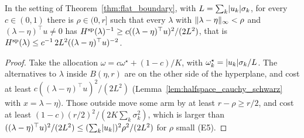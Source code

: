 \begin{lemma}
  \label{lem:static_near_hyperplane}
  \leanok
  In the setting of Theorem~\ref{thm:flat_boundary}, with $L = \sum_k \lvert u_k \rvert \sigma_k$, for
  every $c \in (0, 1)$ there is $\rho \in (0, r]$ such that every $\lambda$ with $\lVert \lambda -
  \eta \rVert_{\infty} < \rho$ and $(\lambda - \eta)^{\top} u \ne 0$ has
  $H^{\mathrm{sp}}(\lambda)^{-1} \ge c ((\lambda - \eta)^{\top} u)^2 / (2 L^2)$, that is
  $H^{\mathrm{sp}}(\lambda) \le c^{-1}\, 2 L^2 ((\lambda - \eta)^{\top} u)^{-2}$.
\end{lemma}

\begin{proof}
  \leanok
  Take the allocation $\omega = c \omega^{\star} + (1 - c) / K$, with $\omega^{\star}_k = \lvert u_k \rvert
  \sigma_k / L$. The alternatives to $\lambda$ inside $B(\eta, r)$ are on the other side of the
  hyperplane, and cost at least $c ((\lambda - \eta)^{\top} u)^2 / (2 L^2)$
  (Lemma~\ref{lem:halfspace_cauchy_schwarz} with $x = \lambda - \eta$). Those outside move some arm
  by at least $r - \rho \ge r / 2$, and cost at least $(1 - c) (r / 2)^2 / (2 K \sum_k \sigma_k^2)$,
  which is larger than $((\lambda - \eta)^{\top} u)^2 / (2 L^2) \le (\sum_k \lvert u_k \rvert)^2 \rho^2 / (2
  L^2)$ for $\rho$ small (E5).
\end{proof}
